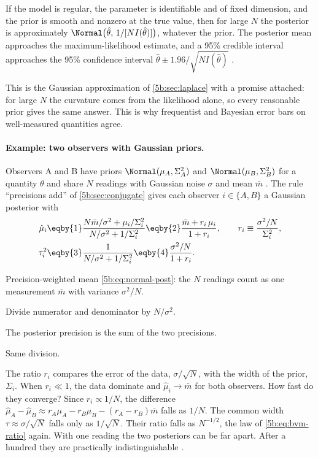 \begin{keyidea}
If the model is regular, the parameter is identifiable and of fixed dimension, and the
prior is smooth and nonzero at the true value, then for large $N$ the posterior is
approximately $\Normal\bigl(\hat\theta,\,1/[N I(\hat\theta)]\bigr)$, whatever the
prior. The posterior mean approaches the maximum-likelihood estimate, and a 95\%
credible interval approaches the 95\% confidence interval $\hat\theta\pm1.96/\sqrt{N
I(\hat\theta)}$ .
\end{keyidea}

This is the Gaussian approximation of \cref{5b:sec:laplace} with a promise attached:
for large $N$ the curvature comes from the likelihood alone, so every reasonable prior
gives the same answer. This is why frequentist and Bayesian error bars on well-measured
quantities agree.

\paragraph{Example: two observers with Gaussian priors.}
Observers A and B have priors $\Normal(\mu_A,\Sigma_A^2)$ and $\Normal(\mu_B,\Sigma_B^2)$
for a quantity $\theta$ and share $N$ readings with Gaussian noise $\sigma$ and mean
$\bar m$ . The rule ``precisions add'' of \cref{5b:sec:conjugate}
gives each observer $i\in\{A,B\}$ a Gaussian posterior with
\begin{align*}
  \hat\mu_i
  &\eqby{1}\frac{N\bar m/\sigma^2+\mu_i/\Sigma_i^2}{N/\sigma^2+1/\Sigma_i^2}
   \eqby{2}\frac{\bar m+r_i\,\mu_i}{1+r_i},
  \qquad r_i\equiv\frac{\sigma^2/N}{\Sigma_i^2},\\
  \tau_i^2
  &\eqby{3}\frac{1}{N/\sigma^2+1/\Sigma_i^2}
   \eqby{4}\frac{\sigma^2/N}{1+r_i}.
\end{align*}
\begin{explain}
  \item Precision-weighted mean \eqref{5b:eq:normal-post}: the $N$ readings count as
        one measurement $\bar m$ with variance $\sigma^2/N$.
  \item Divide numerator and denominator by $N/\sigma^2$.
  \item The posterior precision is the sum of the two precisions.
  \item Same division.
\end{explain}
The ratio $r_i$ compares the error of the data, $\sigma/\sqrt N$, with the width of the
prior, $\Sigma_i$. When $r_i\ll1$, the data dominate and $\hat\mu_i\to\bar m$ for both
observers. How fast do they converge? Since $r_i\propto1/N$, the difference
$\hat\mu_A-\hat\mu_B\approx r_A\mu_A-r_B\mu_B-(r_A-r_B)\bar m$ falls as $1/N$. The common
width $\tau\approx\sigma/\sqrt N$ falls only as $1/\sqrt N$. Their ratio falls as
$N^{-1/2}$, the law of \eqref{5b:eq:bvm-ratio} again. With one reading the two
posteriors can be far apart. After a hundred they are practically indistinguishable
.

